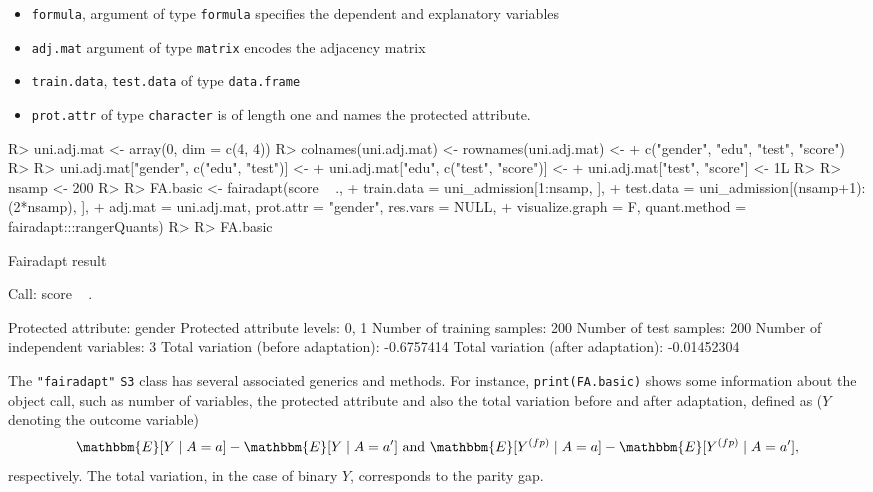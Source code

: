 \documentclass[
  notitle]{jss}
\providecommand{\tightlist}{%
  \setlength{\itemsep}{0pt}\setlength{\parskip}{0pt}}
\begin{document}
\begin{itemize}
\tightlist
\item
  \texttt{formula}, argument of type \texttt{formula} specifies the
  dependent and explanatory variables
\item
  \texttt{adj.mat} argument of type \texttt{matrix} encodes the
  adjacency matrix
\item
  \texttt{train.data}, \texttt{test.data} of type \texttt{data.frame}
\item
  \texttt{prot.attr} of type \texttt{character} is of length one and
  names the protected attribute.
\end{itemize}

\begin{CodeChunk}
\begin{CodeInput}
R> uni.adj.mat <- array(0, dim = c(4, 4))
R> colnames(uni.adj.mat) <- rownames(uni.adj.mat) <-
+   c("gender", "edu", "test", "score")
R> 
R> uni.adj.mat["gender", c("edu", "test")] <-
+   uni.adj.mat["edu", c("test", "score")] <-
+   uni.adj.mat["test", "score"] <- 1L
R> 
R> nsamp <- 200
R> 
R> FA.basic <- fairadapt(score ~ .,
+   train.data = uni_admission[1:nsamp, ],
+   test.data = uni_admission[(nsamp+1):(2*nsamp), ],
+   adj.mat = uni.adj.mat, prot.attr = "gender", res.vars = NULL,
+   visualize.graph = F, quant.method = fairadapt:::rangerQuants)
R> 
R> FA.basic
\end{CodeInput}
\begin{CodeOutput}
Fairadapt result

Call:
 score ~ . 

Protected attribute:                  gender 
Protected attribute levels:           0, 1 
Number of training samples:           200 
Number of test samples:               200 
Number of independent variables:      3 
Total variation (before adaptation):  -0.6757414 
Total variation (after adaptation):   -0.01452304 
\end{CodeOutput}
\end{CodeChunk}

The \texttt{"fairadapt"} \texttt{S3} class has several associated
generics and methods. For instance, \texttt{print(FA.basic)} shows some
information about the object call, such as number of variables, the
protected attribute and also the total variation before and after
adaptation, defined as (\(Y\) denoting the outcome variable)
\[\mathbbm{E}[Y \mid A = a] - \mathbbm{E}[Y \mid A = a'] \text{ and } \mathbbm{E}[ {Y}^{(fp)} \mid A = a] - \mathbbm{E}[ {Y}^{(fp)} \mid A = a'],\]
respectively. The total variation, in the case of binary \(Y\),
corresponds to the parity gap.
\end{document}
